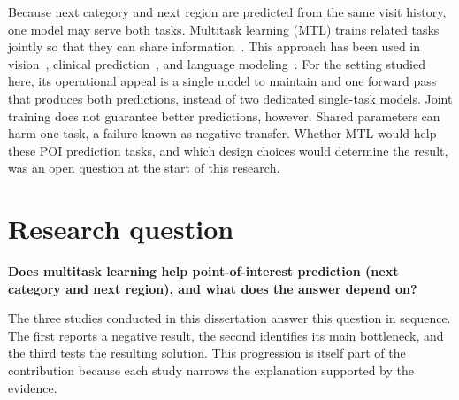 Because next category and next region are predicted from the same visit history, one
model may serve both tasks. Multitask learning (MTL) trains related tasks jointly so
that they can share information~\cite{caruana1997multitask}. This approach has been
used in vision~\cite{kokkinos2016ubernet}, clinical
prediction~\cite{lipton2015learning}, and language
modeling~\cite{wei2022finetuned}. For the setting studied here, its operational appeal
is a single model to maintain and one forward pass that produces both predictions,
instead of two dedicated single-task models. Joint training does not guarantee better
predictions, however. Shared parameters can harm one task, a failure known as negative
transfer. Whether MTL would help these POI prediction tasks, and which design choices
would determine the result, was an open question at the start of this research.




\section{Research question}
\label{sec:intro:arc}

\textbf{Does multitask learning help point-of-interest prediction (next category and
next region), and what does the answer depend on?}

The three studies conducted in this dissertation answer this question in sequence. The first reports a negative
result, the second identifies its main bottleneck, and the third tests the resulting
solution. This progression is itself part of the contribution because each study
narrows the explanation supported by the evidence.

